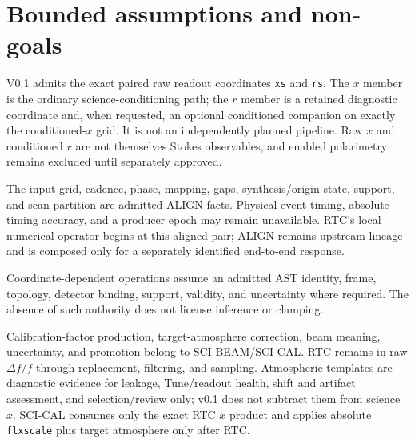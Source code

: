 \section{Bounded assumptions and non-goals}
\label{sec:core-assumptions}

\begin{description}[style=nextline,leftmargin=1em,labelindent=0pt,
  labelwidth=0pt,labelsep=0pt]

\item[SCI-RTC-ASM-001 -- Capability.]
V0.1 admits the exact paired raw readout coordinates \texttt{xs} and
\texttt{rs}.  The $x$ member is the ordinary science-conditioning path; the
$r$ member is a retained diagnostic coordinate and, when requested, an
optional conditioned companion on exactly the conditioned-$x$ grid.  It is
not an independently planned pipeline.  Raw $x$ and conditioned $r$ are not
themselves Stokes observables, and enabled polarimetry remains excluded until
separately approved.

\item[SCI-RTC-ASM-002 -- Aligned-grid boundary.]
The input grid, cadence, phase, mapping, gaps, synthesis/origin state,
support, and scan partition are admitted ALIGN facts.  Physical event timing,
absolute timing accuracy, and a producer epoch may remain unavailable.
RTC's local numerical operator begins at this aligned pair; ALIGN remains
upstream lineage and is composed only for a separately identified end-to-end
response.

\item[SCI-RTC-ASM-003 -- Coordinate boundary.]
Coordinate-dependent operations assume an admitted AST identity, frame,
topology, detector binding, support, validity, and uncertainty where required.
The absence of such authority does not license inference or clamping.

\item[SCI-RTC-ASM-004 -- Calibration boundary.]
Calibration-factor production, target-atmosphere correction, beam meaning,
uncertainty, and promotion belong to SCI-BEAM/SCI-CAL.  RTC remains in raw
$\Delta f/f$ through replacement, filtering, and sampling.  Atmospheric
templates are diagnostic evidence for leakage, Tune/readout health, shift and
artifact assessment, and selection/review only; v0.1 does not subtract them
from science $x$.  SCI-CAL consumes only the exact RTC $x$ product and applies
absolute \texttt{flxscale} plus target atmosphere only after RTC.


\end{description}
